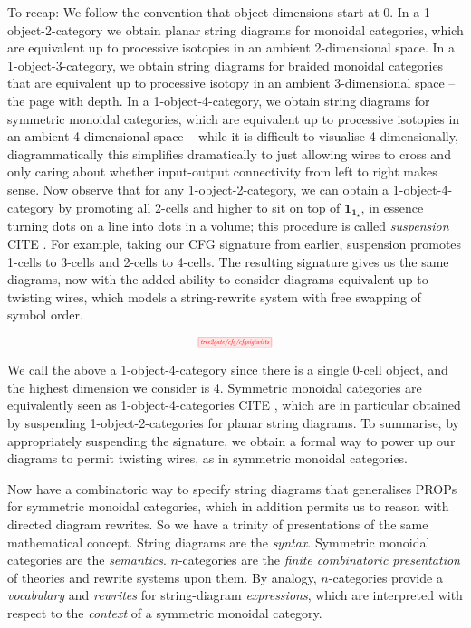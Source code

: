 To recap: We follow the convention that object dimensions start at 0. In a 1-object-2-category we obtain planar string diagrams for monoidal categories, which are equivalent up to processive isotopies in an ambient 2-dimensional space. In a 1-object-3-category, we obtain string diagrams for braided monoidal categories that are equivalent up to processive isotopy in an ambient 3-dimensional space -- the page with depth. In a 1-object-4-category, we obtain string diagrams for symmetric monoidal categories, which are equivalent up to processive isotopies in an ambient 4-dimensional space -- while it is difficult to visualise 4-dimensionally, diagrammatically this simplifies dramatically to just allowing wires to cross and only caring about whether input-output connectivity from left to right makes sense. Now observe that for any 1-object-2-category, we can obtain a 1-object-4-category by promoting all 2-cells and higher to sit on top of $\textbf{1}_{\textbf{1}_\star}$, in essence turning dots on a line into dots in a volume; this procedure is called \emph{suspension} \bR CITE \e. For example, taking our CFG signature from earlier, suspension promotes 1-cells to 3-cells and 2-cells to 4-cells. The resulting signature gives us the same diagrams, now with the added ability to consider diagrams equivalent up to twisting wires, which models a string-rewrite system with free swapping of symbol order.

\[\scalebox{0.5}{\tikzfig{tree2gate/cfg/cfgsigtwists}}\]

We call the above a 1-object-4-category since there is a single 0-cell object, and the highest dimension we consider is 4. Symmetric monoidal categories are equivalently seen as 1-object-4-categories \bR CITE \e, which are in particular obtained by suspending 1-object-2-categories for planar string diagrams. To summarise, by appropriately suspending the signature, we obtain a formal way to power up our diagrams to permit twisting wires, as in symmetric monoidal categories.\\

\begin{remark}
Now have a combinatoric way to specify string diagrams that generalises PROPs for symmetric monoidal categories, which in addition permits us to reason with directed diagram rewrites. So we have a trinity of presentations of the same mathematical concept. String diagrams are the \emph{syntax}. Symmetric monoidal categories are the \emph{semantics}. $n$-categories are the \emph{finite combinatoric presentation} of theories and rewrite systems upon them. By analogy, $n$-categories provide a \emph{vocabulary} and \emph{rewrites} for string-diagram \emph{expressions}, which are interpreted with respect to the \emph{context} of a symmetric monoidal category.
\end{remark}

